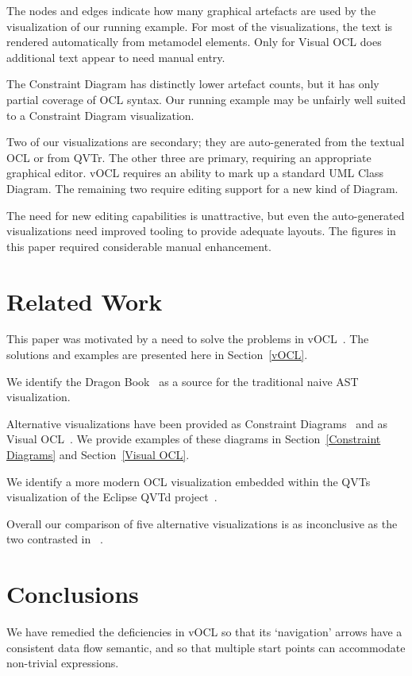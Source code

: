 \documentclass{llncs}
\begin{document}
The nodes and edges indicate how many graphical artefacts are used by the visualization of our running example. For most of the visualizations, the text is rendered automatically from metamodel elements. Only for Visual OCL does additional text appear to need manual entry.  

The Constraint Diagram has distinctly lower artefact counts, but it has only partial coverage of OCL syntax. Our running example may be unfairly well suited to a Constraint Diagram visualization.

Two of our visualizations are secondary; they are auto-generated from the textual OCL or from QVTr. The other three are primary, requiring an appropriate graphical editor. vOCL requires an ability to mark up a standard UML Class Diagram. The remaining two require editing support for a new kind of Diagram.

The need for new editing capabilities is unattractive, but even the auto-generated visualizations need improved tooling to provide adequate layouts. The figures in this paper required considerable manual enhancement.

\section{Related Work}\label{Related Work}

This paper was motivated by a need to solve the problems in vOCL~\cite{vOCL}. The solutions and examples are presented here in Section~\ref{vOCL}.

We identify the Dragon Book~\cite{DragonBook} as a source for the traditional naive AST visualization.

Alternative visualizations have been provided as Constraint Diagrams~\cite{Constraint-Diagrams} and as Visual OCL~\cite{Visual-OCL}. We provide examples of these diagrams in Section~\ref{Constraint Diagrams} and Section~\ref{Visual OCL}.

We identify a more modern OCL visualization embedded within the QVTs visualization of the Eclipse QVTd project~\cite{Eclipse-QVTd}.

Overall our comparison of five alternative visualizations is as inconclusive as the two contrasted in ~\cite{two-OCLs}.

\section{Conclusions}\label{Conclusions}

We have remedied the deficiencies in vOCL so that its `navigation' arrows have a consistent data flow semantic, and so that multiple start points can accommodate non-trivial expressions.
\end{document}
